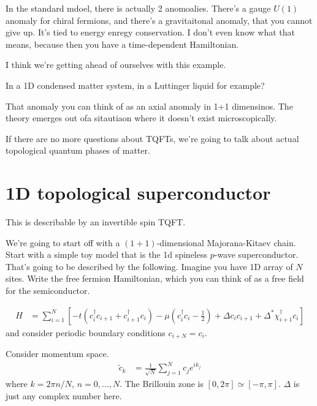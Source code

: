In the standard mdoel,
there is actually 2 anomoalies.
There's a gauge $U(1)$ anomaly for chiral fermions,
and there's a gravitaitonal anomaly,
that you cannot give up.
It's tied to energy enregy conservation.
I don't even know what that means,
because then you have a time-dependent Hamiltonian.

I think we're getting ahead of ourselves with this example.

\begin{question}
    In a 1D condensed matter system,
    in a Luttinger liquid for example?
\end{question}
That anomaly you can think of as an axial anomaly in 1+1 dimensinos.
The theory emerges out ofa sitautiaon where it doesn't exist microscopically.

If there are no more questions about TQFTs,
we're going to talk about actual topological quantum phases of matter.

\section{1D topological superconductor}
This is describable by an invertible spin TQFT.

We're going to start off with a $(1+1)$-dimensional
Majorana-Kitaev chain.
Start with a simple toy model that is the 1d spineless $p$-wave superconductor.
That's going to be described by the following.
Imagine you have 1D array of $N$ sites.
Write the free fermion Hamiltonian,
which you can think of as a free field for the semiconductor.

\begin{align}
    H &=
    \sum_{i=1}^{N}
    \left[ 
    -t\left( c_i^\dagger c_{i+1} + c_{i+1}^\dagger c_i\right)
    - \mu\left( c_i^\dagger c_i - \frac{1}{2} \right)
    + \Delta c_i c_{i+1}
    + \Delta^* \chi_{i+1}^\dagger c_i
    \right]
\end{align}
and consider periodic boundary conditions $c_{i+N}=c_i$.

Consider momentum space.
\begin{align}
    \tilde{c}_k &=
    \frac{1}{\sqrt{N}}
    \sum_{j=1}^{N}
    c_j e^{ik_j}
\end{align}
where $k = 2\pi n/N$,
$n=0,\ldots,N$.
The Brillouin zone is $[0,2\pi] \simeq [-\pi, \pi]$.
$\Delta$ is just any complex number here.

